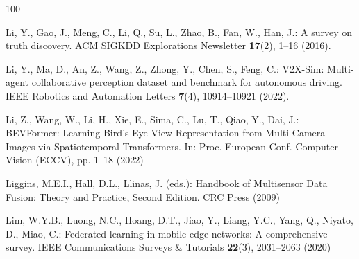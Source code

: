 \documentclass[graybox,envcountchap]{style/SNmono}
\begin{document}
\begin{thebibliography}{100}

Li, Y., Gao, J., Meng, C., Li, Q., Su, L., Zhao, B., Fan, W., Han, J.: A survey
  on truth discovery.
\newblock ACM SIGKDD Explorations Newsletter \textbf{17}(2), 1--16 (2016).
\newblock {}



Li, Y., Ma, D., An, Z., Wang, Z., Zhong, Y., Chen, S., Feng, C.: {V2X-Sim}:
  Multi-agent collaborative perception dataset and benchmark for autonomous
  driving.
\newblock IEEE Robotics and Automation Letters \textbf{7}(4), 10914--10921
  (2022).
\newblock {}


{\color{red} 
Li, Z., Wang, W., Li, H., Xie, E., Sima, C., Lu, T., Qiao, Y., Dai, J.:
  {BEVFormer: Learning Bird's-Eye-View Representation from Multi-Camera Images
  via Spatiotemporal Transformers}.
\newblock In: Proc. European Conf. Computer Vision (ECCV), pp. 1--18 (2022)

\par}
{\color{red} 
Liggins, M.E.I., Hall, D.L., Llinas, J. (eds.): Handbook of Multisensor Data
  Fusion: Theory and Practice, Second Edition.
\newblock CRC Press (2009)

\par}
{\color{red} 
Lim, W.Y.B., Luong, N.C., Hoang, D.T., Jiao, Y., Liang, Y.C., Yang, Q., Niyato,
  D., Miao, C.: Federated learning in mobile edge networks: A comprehensive
  survey.
\newblock IEEE Communications Surveys \& Tutorials \textbf{22}(3), 2031--2063
  (2020)

\par}
\end{thebibliography}
\end{document}
